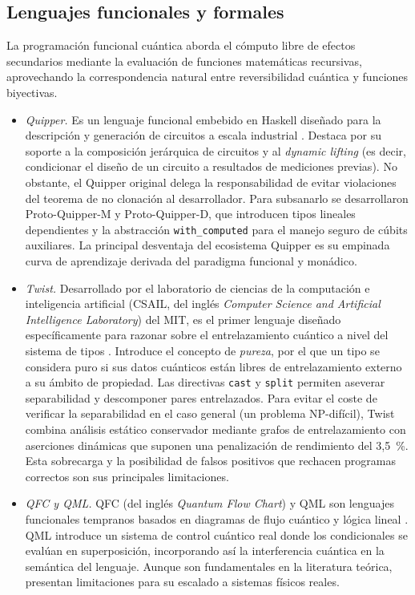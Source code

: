 \subsection{Lenguajes funcionales y formales}
\label{subsec:funcionales}

La programación funcional cuántica aborda el cómputo libre de efectos secundarios mediante la evaluación de funciones matemáticas recursivas, aprovechando la correspondencia natural entre reversibilidad cuántica y funciones biyectivas.

\begin{itemize}
  \item \textit{Quipper.} Es un lenguaje funcional embebido en Haskell diseñado para la descripción y generación de circuitos a escala industrial \cite{quipper_2013}. Destaca por su soporte a la composición jerárquica de circuitos y al \textit{dynamic lifting} (es decir, condicionar el diseño de un circuito a resultados de mediciones previas). No obstante, el Quipper original delega la responsabilidad de evitar violaciones del teorema de no clonación al desarrollador. Para subsanarlo se desarrollaron Proto-Quipper-M y Proto-Quipper-D, que introducen tipos lineales dependientes y la abstracción \lstinline|with_computed| para el manejo seguro de cúbits auxiliares. La principal desventaja del ecosistema Quipper es su empinada curva de aprendizaje derivada del paradigma funcional y monádico.

  \item \textit{Twist.} Desarrollado por el laboratorio de ciencias de la computación e inteligencia artificial (CSAIL, del inglés \textit{Computer Science and Artificial Intelligence Laboratory}) del MIT, es el primer lenguaje diseñado específicamente para razonar sobre el entrelazamiento cuántico a nivel del sistema de tipos \cite{twist_2022}. Introduce el concepto de \textit{pureza}, por el que un tipo se considera puro si sus datos cuánticos están libres de entrelazamiento externo a su ámbito de propiedad. Las directivas \lstinline|cast| y \lstinline|split| permiten aseverar separabilidad y descomponer pares entrelazados. Para evitar el coste de verificar la separabilidad en el caso general (un problema NP-difícil), Twist combina análisis estático conservador mediante grafos de entrelazamiento con aserciones dinámicas que suponen una penalización de rendimiento del 3,5~\%. Esta sobrecarga y la posibilidad de falsos positivos que rechacen programas correctos son sus principales limitaciones.

  \item \textit{QFC y QML.} QFC (del inglés \textit{Quantum Flow Chart}) y QML son lenguajes funcionales tempranos basados en diagramas de flujo cuántico y lógica lineal \cite{qml_2005}. QML introduce un sistema de control cuántico real donde los condicionales se evalúan en superposición, incorporando así la interferencia cuántica en la semántica del lenguaje. Aunque son fundamentales en la literatura teórica, presentan limitaciones para su escalado a sistemas físicos reales.
\end{itemize}

